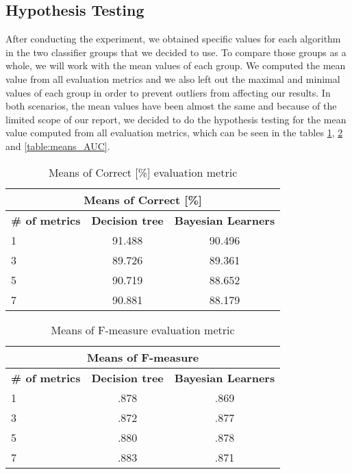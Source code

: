 \subsection{Hypothesis Testing}
After conducting the experiment, we obtained specific values for each algorithm in the two classifier groups that we decided to use. To compare those groups as a whole, we will work with the mean values of each group. We computed the mean value from all evaluation metrics and we also left out the maximal and minimal values of each group in order to prevent outliers from affecting our results. In both scenarios, the mean values have been almost the same and because of the limited scope of our report, we decided to do the hypothesis testing for the mean value computed from all evaluation metrics, which can be seen in the tables \ref{table:means_correct}, \ref{table:means_F-measure} and \ref{table:means_AUC}.
\begin{table}[h!]
\centering
\begin{tabular}{ |l|c|c| }
\hline
\multicolumn{3}{|c|}{\textbf{Means of Correct [\%]}}\\
 \hline
 \textbf{\# of metrics} & \textbf{Decision tree} & \textbf{Bayesian Learners}  \\
 \hline
 1 & 91.488 & 90.496\\
 \hline
 3 &  89.726 & 89.361\\
 \hline
 5 & 90.719 & 88.652\\
 \hline
 7 & 90.881 &  88.179\\
 \hline
\end{tabular}
\caption{Means of Correct [\%] evaluation metric}
\label{table:means_correct}
\end{table} 

\begin{table}[h!]
\centering
\begin{tabular}{ |l|c|c| }
 \hline
 \multicolumn{3}{|c|}{\textbf{Means of F-measure}}\\ \hline
 \textbf{\# of metrics} & \textbf{Decision tree} & \textbf{Bayesian Learners}  \\
 \hline
 1 & .878 & .869\\
 \hline
 3 &  .872 & .877\\
 \hline
 5 & .880 & .878\\
 \hline
 7 & .883 &  .871\\
 \hline
\end{tabular}
\caption{Means of F-measure evaluation metric}
\label{table:means_F-measure}
\end{table} 

